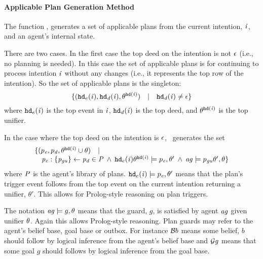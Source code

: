 \paragraph{Applicable Plan Generation Method}

The function \AILappPlans, generates a set of applicable plans from the current intention, $\mathit{i}$, and an
agent's internal state.

There are two cases.  In the first case the top deed on the intention is not $\epsilon$ (i.e., no planning is  needed).  In this case the set of applicable plans is for
continuing to process intention $\mathit{i}$ without any
changes (i.e., it represents the top row of the intention).  So the set of applicable plans is the singleton:
\begin{equation}
\{( {\tt hd}_e(\mathit{i}), 
\mathit{{\tt hd}_d}(\mathit{i}), 
\theta^{{\tt hd}(\mathit{i})} ) \quad |   \quad
 \mathit{{\tt hd}_d}(\mathit{i}) \neq \epsilon
\}
\end{equation}
where ${\tt hd}_e(\mathit{i})$ is the top event in
$\mathit{i}$, 
$\mathit{{\tt hd}_d}(\mathit{i})$ is the top deed, and
$\theta^{{\tt hd}(\mathit{i})}$ is the top unifier.

In the case where the top deed on the intention is $\epsilon$, \AILappPlans\ generates the set
\begin{equation}
\begin{array}{l}
  \{( p_{\mathit{e}}, p_{\mathit{d}},
  \theta^{{\tt hd}(\mathit{i})} \cup \theta ) \quad | \\
  \quad {\ensuremath{\mathit{p_{\mathit{e}}: \{p_{\mathit{gu}}\} \leftarrow p_{\mathit{d}}}}}
  \in \mathit{P} \: \land  \:
  {\tt hd}_e(\mathit{i})\theta^{{\tt hd}(\mathit{i})} \models p_{\mathit{e}}, \theta' \: \land \:
  \mathit{ag} \models p_{\mathit{gu}}\theta',
  \theta \}
\end{array}
\end{equation}
%
where $\mathit{P}$ is the agent's library of  plans.
${\tt hd}_e(\mathit{i}) \models p_{\mathit{e}}, \theta'$ means that the
plan's trigger event follows from the top event on the current
intention returning a unifier, $\theta'$.  This allows for Prolog-style reasoning on plan triggers.

The notation
$\mathit{ag} \models g, \theta$ means that the guard, $g$, is
satisfied by agent $\mathit{ag}$ given unifier $\theta$.  Again this allows Prolog-style reasoning.  Plan guards may refer to the agent's belief base, goal base or outbox.  For instance ${\cal B} b$ means some belief, $b$ should follow by logical inference from the agent's belief base and ${\cal G} g$ means  that some goal $g$ should follows by logical inference from the goal base.

